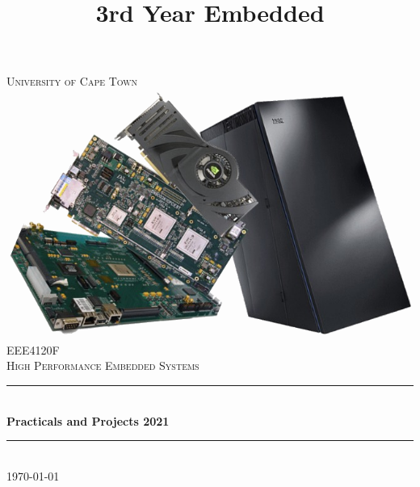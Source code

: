 \title{3rd Year Embedded}

\begin{titlepage}
	\centering
	\vspace*{0.5 cm}
	
	\textsc{\LARGE University of Cape Town}\\[2.0 cm]	%
	\includegraphics[scale = 0.5]{Figures/EEE4048F.png}\\[1 cm]	%
	\textsc{\Large EEE4120F}\\[0.5 cm]				%
	\textsc{\large High Performance Embedded Systems}\\[0.5 cm]				%
	\rule{\linewidth}{0.2 mm} \\[0.4 cm]
	{ \huge \bfseries Practicals and Projects 2021}\\
	\rule{\linewidth}{0.2 mm} \\[1.5 cm]
		\vfill
	{\large \today}\\[2 cm]
	

	
\end{titlepage}